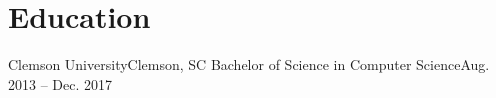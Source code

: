 \section{Education}
  \resumeSubHeadingListStart
    \resumeSubheading
      {Clemson University}{Clemson, SC}
      {Bachelor of Science in Computer Science}{Aug. 2013 -- Dec. 2017}
  \resumeSubHeadingListEnd
